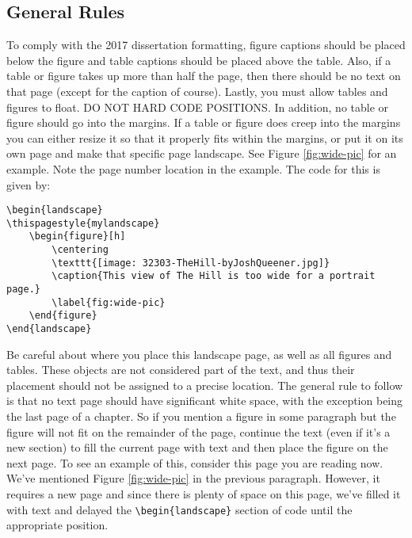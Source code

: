 \subsection{General Rules}
To comply with the 2017 dissertation formatting, figure captions should be placed below the figure and table captions should be placed above the table. Also, if a table or figure takes up more than half the page, then there should be no text on that page (except for the caption of course). Lastly, you must allow tables and figures to float. DO NOT HARD CODE POSITIONS. In addition, no table or figure should go into the margins. If a table or figure does creep into the margins you can either resize it so that it properly fits within the margins, or put it on its own page and make that specific page landscape. See Figure \ref{fig:wide-pic} for an example. Note the page number location in the example. The code for this is given by:

\begin{verbatim}
\begin{landscape}
\thispagestyle{mylandscape}
	\begin{figure}[h]
		\centering
		\texttt{[image: 32303-TheHill-byJoshQueener.jpg]}
		\caption{This view of The Hill is too wide for a portrait page.}
		\label{fig:wide-pic}
	\end{figure}
\end{landscape}
\end{verbatim}

Be careful about where you place this landscape page, as well as all figures and tables. These objects are not considered part of the text, and thus their placement should not be assigned to a precise location. The general rule to follow is that no text page should have significant white space, with the exception being the last page of a chapter. So if you mention a figure in some paragraph but the figure will not fit on the remainder of the page, continue the text (even if it's a new section) to fill the current page with text and then place the figure on the next page. To see an example of this, consider this page you are reading now. We've mentioned Figure \ref{fig:wide-pic} in the previous paragraph. However, it requires a new page and since there is plenty of space on this page, we've filled it with text and delayed the \verb|\begin{landscape}| section of code until the appropriate position.

